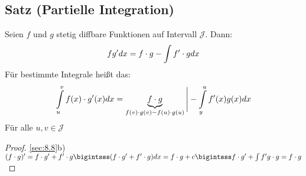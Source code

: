 \subsection{Satz (Partielle Integration)}\label{sec:8.11}
Seien $f$ und $g$ stetig diffbare Funktionen auf Intervall $\mathcal{J}$. Dann:\[ fg'dx = f \cdot g - \int f'\cdot g dx \]
Für bestimmte Integrale hei\ss t das:\\
\[ \int\limits_{u}^{v} f(x)\cdot g'(x)dx = \underbrace{f \cdot g}_{f(v)\cdot g(v) - f(u)\cdot g(u)}\Bigg\vert - \int\limits_{y}^{u}f'(x)g(x)dx \]
Für alle $u,v \in \mathcal{J}$\\
\begin{proof}
\ref{sec:8.8}b)\\
$(f\cd g)' = f \cd g' + f' \cd g\\
\bigintsss (f \cd g' + f' \cd g)dx = f\cd g +c\\
\bigintsss f \cd g' + \int f'g \cd g = f \cd g$
\end{proof}
